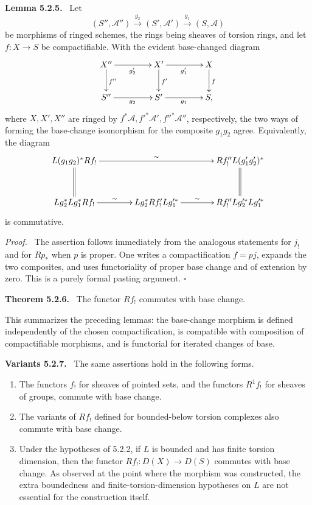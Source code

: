 \documentclass[12pt]{article}
\newcommand{\Aa}{\mathcal A}
\newcommand{\qedtext}{\hfill\(\square\)}
\newenvironment{statement}[1]{\par\medskip\noindent\textbf{#1.}\ }{\par\medskip}
\newenvironment{remarktext}[1]{\par\medskip\noindent\textbf{#1.}\ }{\par\medskip}
\newenvironment{prooftext}[1][Proof]{\par\noindent\emph{#1.}\ }{\par\medskip}
\begin{document}
\begin{statement}{Lemma 5.2.5}
Let
\[
(S'',\Aa'')\xrightarrow{g_2}(S',\Aa')\xrightarrow{g_1}(S,\Aa)
\]
be morphisms of ringed schemes, the rings being sheaves of torsion rings, and let \(f:X\to S\) be compactifiable. With the evident base-changed diagram
\[
\xymatrix@C=1.5cm{
X''\ar[r]_{g'_2}\ar[d]^{f''}&X'\ar[r]_{g'_1}\ar[d]^{f'}&X\ar[d]^{f}\\
S''\ar[r]_{g_2}&S'\ar[r]_{g_1}&S,
}
\]
where \(X,X',X''\) are ringed by \(f^*\Aa,{f'}^*\Aa',{f''}^*\Aa''\), respectively, the two ways of forming the base-change isomorphism for the composite \(g_1g_2\) agree. Equivalently, the diagram
\[
\xymatrix@C=1.35cm@R=1.15cm{
L(g_1g_2)^*Rf_! \ar[rr]^-{\sim}\ar@{=}[d]&&Rf''_!L(g'_1g'_2)^*\ar@{=}[d]\\
Lg_2^*Lg_1^*Rf_!\ar[r]^-{\sim}&Lg_2^*Rf'_!Lg_1'^*\ar[r]^-{\sim}&Rf''_!Lg_2'^*Lg_1'^*
}
\]
is commutative.
\end{statement}

\begin{prooftext}
The assertion follows immediately from the analogous statements for \(j_!\) and for \(Rp_*\) when \(p\) is proper. One writes a compactification \(f=pj\), expands the two composites, and uses functoriality of proper base change and of extension by zero. This is a purely formal pasting argument. \qedtext
\end{prooftext}

\begin{statement}{Theorem 5.2.6}
The functor \(Rf_!\) commutes with base change.
\end{statement}

This summarizes the preceding lemmas: the base-change morphism is defined independently of the chosen compactification, is compatible with composition of compactifiable morphisms, and is functorial for iterated changes of base.

\begin{remarktext}{Variants 5.2.7}
The same assertions hold in the following forms.
\begin{enumerate}[label=(\roman*)]
\item The functors \(f_!\) for sheaves of pointed sets, and the functors \(R^1f_!\) for sheaves of groups, commute with base change.
\item The variants of \(Rf_!\) defined for bounded-below torsion complexes also commute with base change.
\item Under the hypotheses of 5.2.2, if \(L\) is bounded and has finite torsion dimension, then the functor \(Rf_!:D(X)\to D(S)\) commutes with base change. As observed at the point where the morphism was constructed, the extra boundedness and finite-torsion-dimension hypotheses on \(L\) are not essential for the construction itself.
\end{enumerate}
\end{remarktext}
\end{document}

